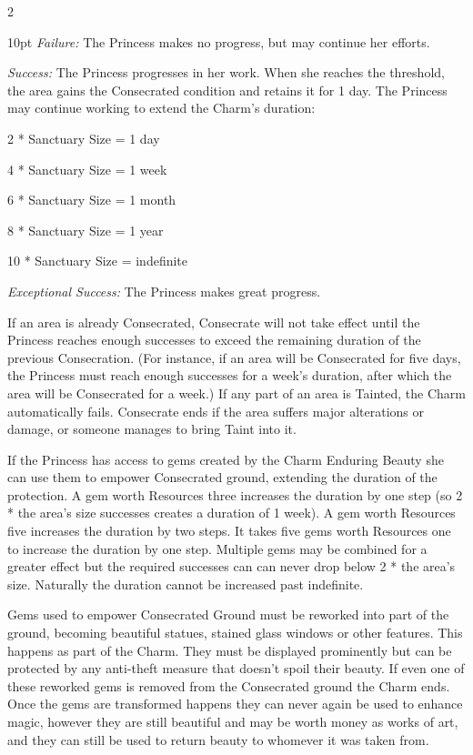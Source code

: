 \begin{multicols}{2}
\begin{myindentpar}{10pt}
    \emph{Failure:} The Princess makes no progress, but may continue her efforts.

    \emph{Success:} The Princess progresses in her work. When she reaches the threshold, the area gains the Consecrated condition and retains it for 1 day. The Princess may continue working to extend the Charm's duration:

    2 * Sanctuary Size = 1 day
    
    4 * Sanctuary Size = 1 week
    
    6 * Sanctuary Size = 1 month
    
    8 * Sanctuary Size = 1 year
    
    10 * Sanctuary Size = indefinite 

    \emph{Exceptional Success:} The Princess makes great progress.\end{myindentpar}

\noindent  If an area is already Consecrated, Consecrate will not take effect until the Princess reaches enough successes to exceed the remaining duration of the previous Consecration. (For instance, if an area will be Consecrated for five days, the Princess must reach enough successes for a week's duration, after which the area will be Consecrated for a week.) If any part of an area is Tainted, the Charm automatically fails. Consecrate ends if the area suffers major alterations or damage, or someone manages to bring Taint into it.

If the Princess has access to gems created by the Charm Enduring Beauty she can use them to empower Consecrated ground, extending the duration of the protection. A gem worth Resources three increases the duration by one step (so 2 * the area's size successes creates a duration of 1 week). A gem worth Resources five increases the duration by two steps. It takes five gems worth Resources one to increase the duration by one step. Multiple gems may be combined for a greater effect but the required successes can can never drop below 2 * the area's size. Naturally the duration cannot be increased past indefinite. 

Gems used to empower Consecrated Ground must be reworked into part of the ground, becoming beautiful statues, stained glass windows or other features. This happens as part of the Charm. They must be displayed prominently but can be protected by any anti-theft measure that doesn’t spoil their beauty. If even one of these reworked gems is removed from the Consecrated ground the Charm ends. Once the gems are transformed happens they can never again be used to enhance magic, however they are still beautiful and may be worth money as works of art, and they can still be used to return beauty to whomever it was taken from.


\end{multicols}
